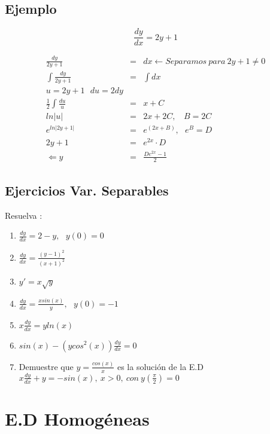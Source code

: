 \documentclass{article}
\begin{document}
\subsection{Ejemplo}

\begin{equation}
\frac{dy}{dx} = 2y +1 
\end{equation}

\begin{eqnarray}
\nonumber \frac{dy}{2y +1} &=& dx \leftarrow Separamos \ para \  2y +1 \neq 0 \\
\nonumber \int \frac{dy}{2y+1} &=& \int dx \\ 
\nonumber u = 2y+1 \ \ \ du =2dy & & \\
\nonumber \frac{1}{2} \int \frac{du}{u} &=& x + C \\
\nonumber ln \rvert u \lvert &=& 2x + 2C , \ \ \ \ B = 2C \\
\nonumber e^{ln \rvert 2y +1 \lvert} &=& e^{\left( 2x + B \right)}, \ \ \ e^B = D \\
\nonumber 2y + 1 &=& e^{2x} \cdot D \\
\nonumber \Leftarrow y &=& \frac{De^{2x}-1}{2}
\end{eqnarray}

\subsection{Ejercicios Var. Separables}


Resuelva : 

\begin{enumerate}
\item $\frac{dy}{dx} = 2-y, \ \ \ y\left( 0 \right) = 0 $
\item $\frac{dy}{dx} = \frac{\left( y-1 \right)^2 }{\left( x+1 \right)^2 } $
\item $y' = x \sqrt{y} $
\item $\frac{dy}{dx} = \frac{xsin(x)}{y}, \ \ \ y\left(0 \right) = -1 $
\item $x \frac{dy}{dx} = y ln(x) $
\item $sin(x)- \left( y cos^2(x) \right) \frac{dy}{dx} = 0 $
\item Demuestre que $ y = \frac{cos(x)}{x}$ es la solución de la E.D $x \frac{dy}{dx} + y=-sin(x), \ x > 0,\  con \ y\left(\frac{\pi}{2} \right) = 0  $
\end{enumerate}

\section{E.D Homogéneas}
\end{document}
